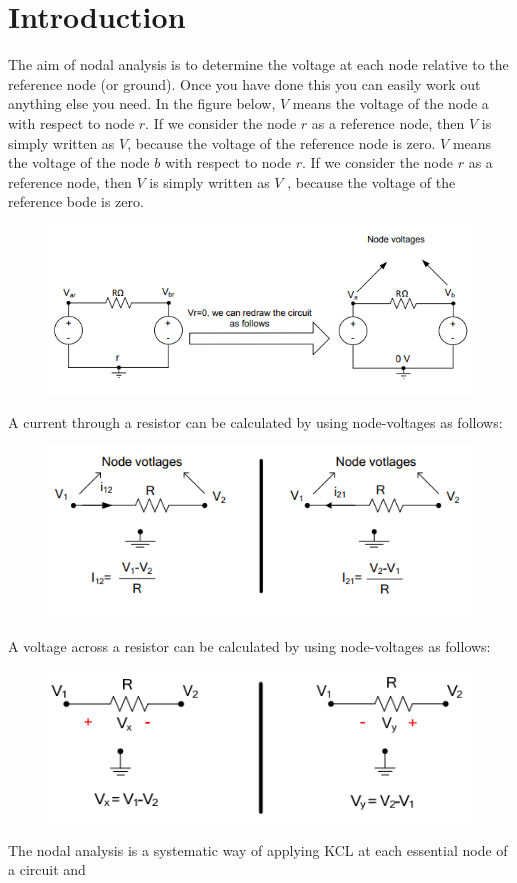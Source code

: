 \documentclass[letterpaper]{article}
\begin{document}
\section{Introduction}
The aim of nodal analysis is to determine the voltage at each node relative to the
reference node (or ground). Once you have done this you can easily work out anything else you
need. In the figure below, $V$ means the voltage of the node a with respect to node $r$. If we
consider the node $r$ as a reference node, then $V$ is simply written as $V$, because the voltage
of the reference node is zero.
$V$ means the voltage of the node $b$ with respect to node $r$. If we consider the node $r$ as
a reference node, then $V$ is simply written as $V$ , because the voltage of the reference bode
is zero.
\begin{figure}[H]
    \centering
    \includegraphics[width=.65\linewidth]{img/img1}
\end{figure}
A current through a resistor can be calculated by using node-voltages as follows:
\begin{figure}[H]
    \centering
    \includegraphics[width=.65\linewidth]{img/img2}
\end{figure}
A voltage across a resistor can be calculated by using node-voltages as follows:
\begin{figure}[H]
    \centering
    \includegraphics[width=.65\linewidth]{img/img3}
\end{figure}
The nodal analysis is a systematic way of applying KCL at each essential node of a circuit and
\end{document}
